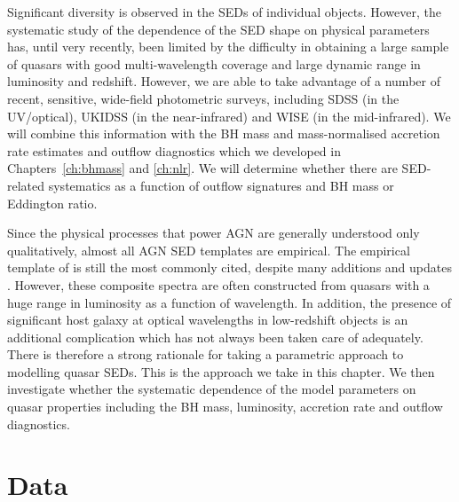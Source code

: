 Significant diversity is observed in the \ac{SED}s of individual objects. 
However, the systematic study of the dependence of the \ac{SED} shape on physical parameters has, until very recently, been limited by the difficulty in obtaining a large sample of quasars with good multi-wavelength coverage and large dynamic range in luminosity and redshift. 
However, we are able to take advantage of a number of recent, sensitive, wide-field photometric surveys, including SDSS (in the UV/optical), UKIDSS (in the near-infrared) and WISE (in the mid-infrared).
We will combine this information with the \ac{BH} mass and mass-normalised accretion rate estimates and outflow diagnostics which we developed in Chapters~\ref{ch:bhmass} and \ref{ch:nlr}. 
We will determine whether there are \ac{SED}-related systematics as a function of outflow signatures and \ac{BH} mass or Eddington ratio. 

Since the physical processes that power \ac{AGN} are generally understood only qualitatively, almost all \ac{AGN} \ac{SED} templates are empirical. 
The empirical template of \citet{elvis94} is still the most commonly cited, despite many additions and updates \citep[e.g.][]{polletta00, kuraszkiewicz03, risaliti04, richards06,  polletta07, lusso10, shang11, marchese12, trichas12}. 
However, these composite spectra are often constructed from quasars with a huge range in luminosity as a function of wavelength. 
In addition, the presence of significant host galaxy at optical wavelengths in low-redshift objects is an additional complication which has not always been taken care of adequately. 
There is therefore a strong rationale for taking a parametric approach to modelling quasar \ac{SED}s. 
This is the approach we take in this chapter. 
We then investigate whether the systematic dependence of the model parameters on quasar properties including the BH mass, luminosity, accretion rate and outflow diagnostics. 

\section{Data}

